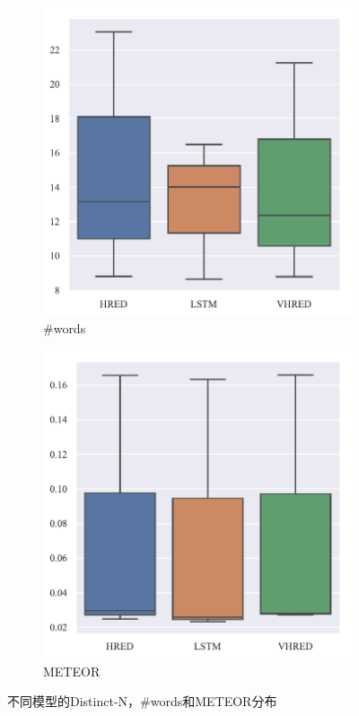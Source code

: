 \begin{figure}[H]
    \begin{subfigure}{0.5\linewidth}
        \centering
        \includegraphics[width=\linewidth]{figure/boxplot/model/utterance_len/plot.pdf}
        \caption{\#words}
        \label{fig:words_model}
    \end{subfigure}%
    \begin{subfigure}{0.5\linewidth}
        \centering
        \includegraphics[width=\linewidth]{figure/boxplot/model/meteor/plot.pdf}
        \caption{METEOR}
        \label{fig:meteor_model}
    \end{subfigure}
    \caption{不同模型的Distinct-N，\#words和METEOR分布}
    \label{fig:Other_model}
\end{figure}
